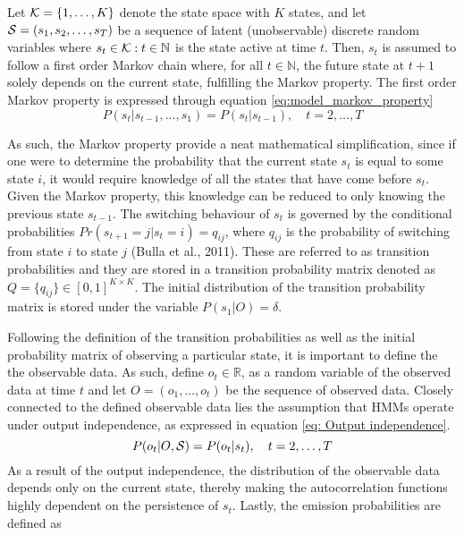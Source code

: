 Let $\K=\{ 1,\ldots, K \}$ denote the state space with $K$ states, and let $\S=(s_1,s_2,\ldots,s_T)$ be a sequence of latent (unobservable) discrete random variables where $s_t\in\K: t\in \mathbb{N}$ is the state active at time $t$. Then, $s_t$ is assumed to follow a first order Markov chain where, for all $t \in \mathbb{N}$, the future state at $t + 1$ solely depends on the current state, fulfilling the Markov property. The first order Markov property is expressed through equation \ref{eq:model_markov_property}
\begin{equation}
    P(s_t | s_{t-1},\ldots,s_1) = P(s_t | s_{t-1}),
    \quad t=2,\ldots,T
    \label{eq:model_markov_property}
\end{equation} 

As such, the Markov property provide a neat mathematical simplification, since if one were to determine the probability that the current state $s_t$ is equal to some state $i$, it would require knowledge of all the states that have come before $s_t$. Given the Markov property, this knowledge can be reduced to only knowing the previous state $s_{t-1}$. The switching behaviour of $s_t$ is governed by the conditional probabilities $Pr(s_{t+1} = j| s_t = i) = q_{ij}$, where $q_{ij}$ is the probability of switching from state $i$ to state $j$ (Bulla et al., 2011). These are referred to as transition probabilities and they are stored in a transition probability matrix denoted as $Q = \{q_{ij}\} \in [0,1]^{K \times K}$. The initial distribution of the transition probability matrix is stored under the variable $P(s_1|O)= \delta$.

Following the definition of the transition probabilities as well as the initial probability matrix of observing a particular state, it is important to define the the observable data. As such, define $o_t \in \mathbb{R}$, as a random variable of the observed data at time $t$ and let $O=(o_1,\ldots,o_t)$ be the sequence of observed data. Closely connected to the defined observable data lies the assumption that HMMs operate under output independence, as expressed in equation \ref{eq: Output independence}.
\begin{equation}
    P(o_t|O, \S) = P(o_t|s_t),
    \quad t=2,\ldots,T
    \label{eq: Output independence}
\end{equation}
As a result of the output independence, the distribution of the observable data depends only on the current state, thereby making the autocorrelation functions highly dependent on the persistence of $s_t$. Lastly, the emission probabilities are defined as

